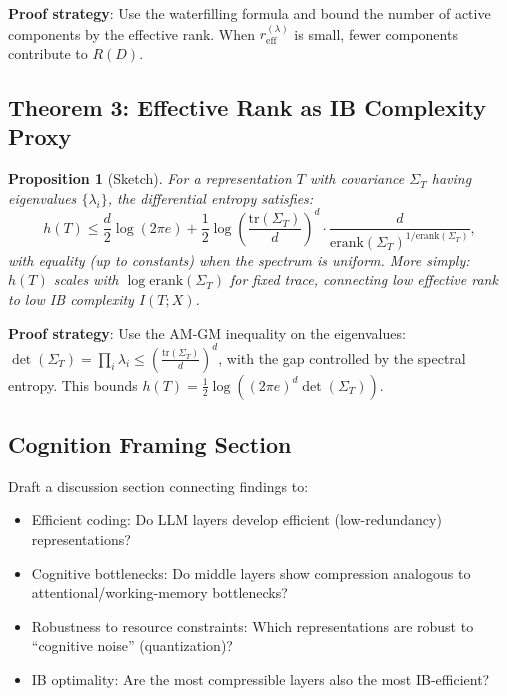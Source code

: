\documentclass[11pt,a4paper]{article}
\newtheorem{proposition}{Proposition}
\begin{document}
\textbf{Proof strategy}: Use the waterfilling formula and bound the number of active components by the effective rank. When $r_{\text{eff}}^{(\lambda)}$ is small, fewer components contribute to $R(D)$.

\subsection{Theorem 3: Effective Rank as IB Complexity Proxy}

\begin{proposition}[Sketch]
For a representation $T$ with covariance $\Sigma_T$ having eigenvalues $\{\lambda_i\}$, the differential entropy satisfies:
\begin{equation}
    h(T) \leq \frac{d}{2}\log(2\pi e) + \frac{1}{2}\log\!\left(\frac{\text{tr}(\Sigma_T)}{d}\right)^d \cdot \frac{d}{\text{erank}(\Sigma_T)^{1/\text{erank}(\Sigma_T)}},
\end{equation}
with equality (up to constants) when the spectrum is uniform. More simply: $h(T)$ scales with $\log \text{erank}(\Sigma_T)$ for fixed trace, connecting low effective rank to low IB complexity $I(T;X)$.
\end{proposition}

\textbf{Proof strategy}: Use the AM-GM inequality on the eigenvalues: $\det(\Sigma_T) = \prod_i \lambda_i \leq \left(\frac{\text{tr}(\Sigma_T)}{d}\right)^d$, with the gap controlled by the spectral entropy. This bounds $h(T) = \frac{1}{2}\log((2\pi e)^d \det(\Sigma_T))$.

\subsection{Cognition Framing Section}
Draft a discussion section connecting findings to:
\begin{itemize}
    \item Efficient coding: Do LLM layers develop efficient (low-redundancy) representations?
    \item Cognitive bottlenecks: Do middle layers show compression analogous to attentional/working-memory bottlenecks?
    \item Robustness to resource constraints: Which representations are robust to ``cognitive noise'' (quantization)?
    \item IB optimality: Are the most compressible layers also the most IB-efficient?
\end{itemize}

\end{document}
